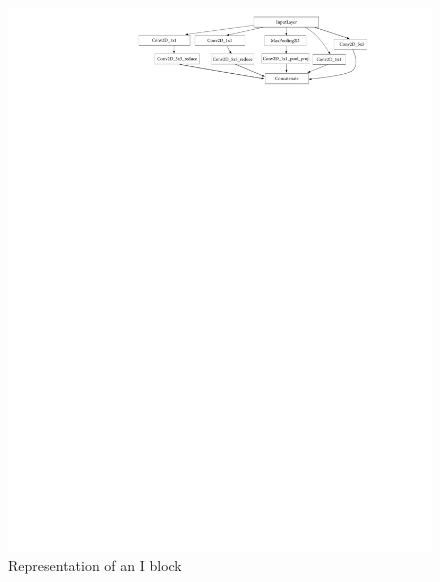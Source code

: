 \documentclass[10pt,twocolumn,letterpaper]{article}
\begin{document}
\begin{figure}[h]
   \centering
   \includegraphics[width=1\linewidth]{./immagini/m_inception_v0.pdf}
   \caption{Representation of an I block}
\end{figure}
\newpage
\end{document}
